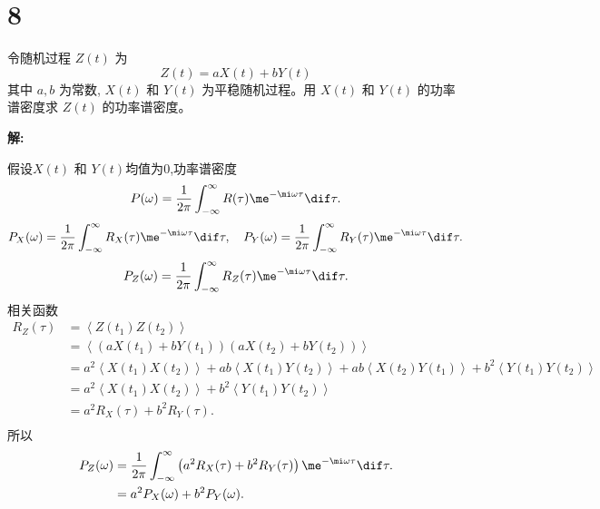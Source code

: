 \documentclass[12pt,a4]{ctexart}
\begin{document}
\section{8}


令随机过程 $Z(t)$ 为
\begin{equation}
	Z(t)=a X(t)+b Y(t)
\end{equation}
其中 $a, b$ 为常数, $X(t)$ 和 $Y(t)$ 为平稳随机过程。用 $X(t)$ 和 $Y(t)$ 的功率谱密度求 $Z(t)$ 的功率谱密度。

\textsf{\hspace{-2em}\sf  \textbf{解:}}

假设$X(t)$ 和 $Y(t)$均值为$0$,功率谱密度\cite[P101]{suiji}
\begin{equation}
	P(\omega)  =\frac{1}{2\pi} \int^{\infty}_{-\infty} R(\tau) \me^{-\mi \omega \tau} \dif \tau.
\end{equation}
\begin{equation}
	P_X(\omega)  =\frac{1}{2\pi} \int^{\infty}_{-\infty} R_X(\tau) \me^{-\mi \omega \tau} \dif \tau, \quad P_Y(\omega)  =\frac{1}{2\pi} \int^{\infty}_{-\infty} R_Y(\tau) \me^{-\mi \omega \tau} \dif \tau.
\end{equation}
\begin{equation}
	P_Z(\omega)  =\frac{1}{2\pi} \int^{\infty}_{-\infty} R_Z(\tau) \me^{-\mi \omega \tau} \dif \tau.
\end{equation}
相关函数
\begin{equation}
	\begin{aligned}
		R_Z(\tau) & = \left\langle Z(t_1) Z(t_2)\right\rangle                                                                                                                                                  \\
				  & = \left\langle (a X(t_1)+b Y(t_1)) (a X(t_2)+b Y(t_2)) \right\rangle                                                                                                                       \\
				  & = a^2 \left\langle X(t_1) X(t_2) \right\rangle + ab \left\langle X(t_1) Y(t_2) \right\rangle + ab \left\langle X(t_2) Y(t_1) \right\rangle  + b^2 \left\langle Y(t_1) Y(t_2) \right\rangle \\
				  & = a^2 \left\langle X(t_1) X(t_2) \right\rangle + b^2 \left\langle Y(t_1) Y(t_2) \right\rangle                                                                                              \\
				  & = a^2 R_X(\tau) + b^2 R_Y(\tau).                                                                                                                                                           \\
	\end{aligned}
\end{equation}
所以
\begin{equation}
	\begin{aligned}
		P_Z(\omega) & =\frac{1}{2\pi} \int^{\infty}_{-\infty} \left(a^2 R_X(\tau) + b^2 R_Y(\tau)\right) \me^{-\mi \omega \tau} \dif \tau. \\
					& = a^2 P_X(\omega) + b^2 P_Y(\omega).
	\end{aligned}
\end{equation}
\end{document}
